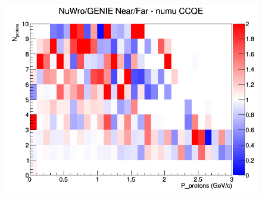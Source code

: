 \begin{figure}[h]
\endminipage
{}
\includegraphics[width=\linewidth]{N_P/nominal/protons/ratios/CCQE_NuWro_GENIE_numu_NF_N_P.png}
\endminipage
\newline
\end{figure}
\clearpage
